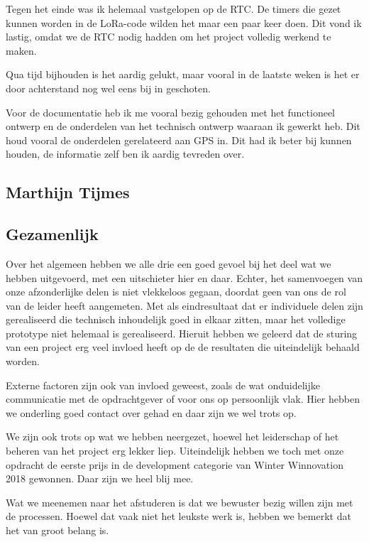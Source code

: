 Tegen het einde was ik helemaal vastgelopen op de RTC. De timers
die gezet kunnen worden in de LoRa-code wilden het maar een paar keer doen. Dit
vond ik lastig, omdat we de RTC nodig hadden om het project volledig werkend te
maken.

Qua tijd bijhouden is het aardig gelukt, maar vooral in de laatste weken is het
er door achterstand nog wel eens bij in geschoten.

Voor de documentatie heb ik me vooral bezig gehouden met het functioneel ontwerp
en de onderdelen van het technisch ontwerp waaraan ik gewerkt heb. Dit houd
vooral de onderdelen gerelateerd aan GPS in. Dit had ik beter bij kunnen houden,
de informatie zelf ben ik aardig tevreden over.

\subsection{Marthijn Tijmes}

\subsection{Gezamenlijk}
Over het algemeen hebben we alle drie een goed gevoel bij het deel wat we hebben
uitgevoerd, met een uitschieter hier en daar. Echter, het samenvoegen van onze
afzonderlijke delen is niet vlekkeloos gegaan, doordat geen van ons de rol van
de leider heeft aangemeten. Met als eindresultaat dat er individuele delen zijn
gerealiseerd die technisch inhoudelijk goed in elkaar zitten, maar het volledige
prototype niet helemaal is gerealiseerd. Hieruit hebben we geleerd dat de
sturing van een project erg veel invloed heeft op de de resultaten die
uiteindelijk behaald worden.

Externe factoren zijn ook van invloed geweest, zoals de wat onduidelijke
communicatie met de opdrachtgever of voor ons op persoonlijk vlak. Hier hebben
we onderling goed contact over gehad en daar zijn we wel trots op.

We zijn ook trots op wat we hebben neergezet, hoewel het leiderschap of het
beheren van het project erg lekker liep. Uiteindelijk hebben we toch met onze
opdracht de eerste prijs in de development categorie van Winter Winnovation 2018
gewonnen. Daar zijn we heel blij mee.

Wat we meenemen naar het afstuderen is dat we bewuster bezig willen zijn met de
processen. Hoewel dat vaak niet het leukste werk is, hebben we bemerkt dat het
van groot belang is.